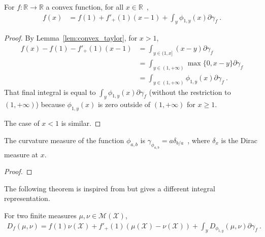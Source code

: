 \begin{corollary}
  \label{cor:convex_taylor_statInfoFun}
  \leanok
  For $f: \mathbb{R} \to \mathbb{R}$ a convex function, for all $x \in \mathbb{R}$~,
  \begin{align*}
  f(x) &= f(1) + f'_+(1) (x - 1) + \int_{y} \phi_{1,y}(x) \partial\gamma_f \: .
  \end{align*}
\end{corollary}

\begin{proof}\leanok
{}
By Lemma~\ref{lem:convex_taylor}, for $x > 1$,
\begin{align*}
f(x) - f(1) - f'_+(1) (x - 1)
&= \int_{y \in (1, x]} (x - y) \partial\gamma_f
\\
&= \int_{y \in (1, +\infty)} \max\{0, x - y\} \partial\gamma_f
\\
&= \int_{y \in (1, +\infty)} \phi_{1,y}(x) \partial\gamma_f
\: .
\end{align*}
That final integral is equal to $\int_y \phi_{1,y}(x) \partial\gamma_f$ (without the restriction to $(1, +\infty)$) because $\phi_{1,y}(x)$ is zero outside of $(1, +\infty)$ for $x \ge 1$.

The case of $x < 1$ is similar.
\end{proof}


\begin{lemma}
  \label{lem:curvatureMeasure_statInfoFun}
  The curvature measure of the function $\phi_{a,b}$ is $\gamma_{\phi_{a,b}} = a\delta_{b/a}$~, where $\delta_x$ is the Dirac measure at $x$.
\end{lemma}

\begin{proof}%
\uses{}

\end{proof}

The following theorem is inspired from \cite{liese2006divergences,liese2012phi} but gives a different integral representation.

\begin{theorem}
  \label{thm:fDiv_eq_integral_eGamma}
  For two finite measures $\mu, \nu \in \mathcal M(\mathcal X)$,
  \begin{align*}
  D_f(\mu, \nu) = f(1) \nu(\mathcal X) + f'_+(1)(\mu(\mathcal X) - \nu(\mathcal X)) + \int_y D_{\phi_{1,y}}(\mu, \nu) \partial\gamma_f \: .
  \end{align*}
\end{theorem}


